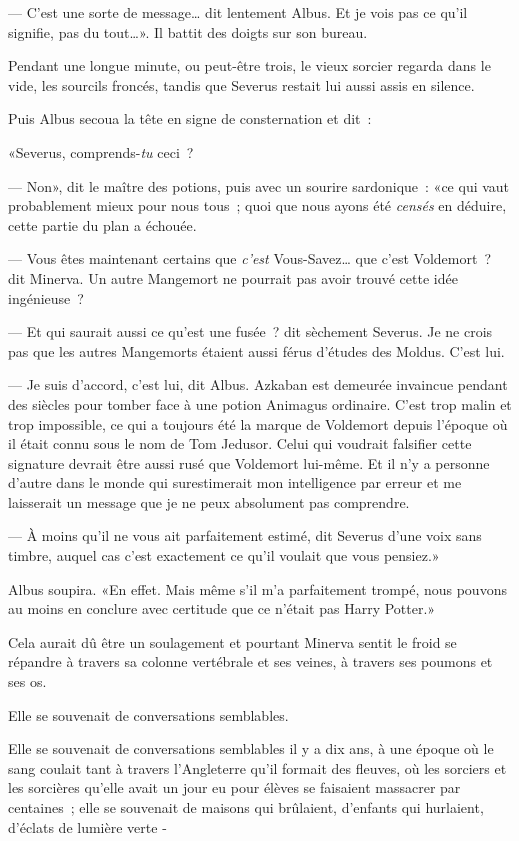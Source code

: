 --- C'est une sorte de message… dit lentement Albus. Et je vois pas ce qu'il signifie, pas du tout…». Il battit des doigts sur son bureau.

Pendant une longue minute, ou peut-être trois, le vieux sorcier regarda dans le vide, les sourcils froncés, tandis que Severus restait lui aussi assis en silence.

Puis Albus secoua la tête en signe de consternation et dit~:

«Severus, comprends-\emph{tu} ceci~?

--- Non», dit le maître des potions, puis avec un sourire sardonique~: «ce qui vaut probablement mieux pour nous tous~; quoi que nous ayons été \emph{censés} en déduire, cette partie du plan a échouée.

--- Vous êtes maintenant certains que \emph{c'est} Vous-Savez… que c'est Voldemort~? dit Minerva. Un autre Mangemort ne pourrait pas avoir trouvé cette idée ingénieuse~?

--- Et qui saurait aussi ce qu'est une fusée~? dit sèchement Severus. Je ne crois pas que les autres Mangemorts étaient aussi férus d'études des Moldus. C'est lui.

--- Je suis d'accord, c'est lui, dit Albus. Azkaban est demeurée invaincue pendant des siècles pour tomber face à une potion Animagus ordinaire. C'est trop malin et trop impossible, ce qui a toujours été la marque de Voldemort depuis l'époque où il était connu sous le nom de Tom Jedusor. Celui qui voudrait falsifier cette signature devrait être aussi rusé que Voldemort lui-même. Et il n'y a personne d'autre dans le monde qui surestimerait mon intelligence par erreur et me laisserait un message que je ne peux absolument pas comprendre.

--- À moins qu'il ne vous ait parfaitement estimé, dit Severus d'une voix sans timbre, auquel cas c'est exactement ce qu'il voulait que vous pensiez.»

Albus soupira. «En effet. Mais même s'il m'a parfaitement trompé, nous pouvons au moins en conclure avec certitude que ce n'était pas Harry Potter.»

Cela aurait dû être un soulagement et pourtant Minerva sentit le froid se répandre à travers sa colonne vertébrale et ses veines, à travers ses poumons et ses os.

Elle se souvenait de conversations semblables.

Elle se souvenait de conversations semblables il y a dix ans, à une époque où le sang coulait tant à travers l'Angleterre qu'il formait des fleuves, où les sorciers et les sorcières qu'elle avait un jour eu pour élèves se faisaient massacrer par centaines~; elle se souvenait de maisons qui brûlaient, d'enfants qui hurlaient, d'éclats de lumière verte -

